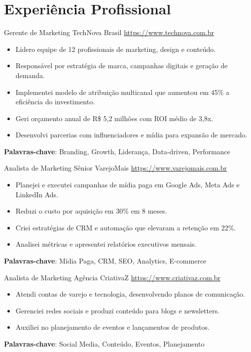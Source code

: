 \documentclass[a4paper, serif, 10pt]{moderncv}
\begin{document}
\section{Experiência Profissional}

        {Gerente de Marketing}
        {TechNova Brasil}
        {\url{https://www.technova.com.br}}
        {}
        {\begin{itemize}
\item Lidero equipe de 12 profissionais de marketing, design e conteúdo.
\item Responsável por estratégia de marca, campanhas digitais e geração de demanda.
\item Implementei modelo de atribuição multicanal que aumentou em 45\% a eficiência do investimento.
\item Geri orçamento anual de R\$ 5,2 milhões com ROI médio de 3,8x.
\item Desenvolvi parcerias com influenciadores e mídia para expansão de mercado.
\end{itemize}
\textbf{Palavras-chave}: Branding, Growth, Liderança, Data-driven, Performance}

        {Analista de Marketing Sênior}
        {VarejoMais}
        {\url{https://www.varejomais.com.br}}
        {}
        {\begin{itemize}
\item Planejei e executei campanhas de mídia paga em Google Ads, Meta Ads e LinkedIn Ads.
\item Reduzi o custo por aquisição em 30\% em 8 meses.
\item Criei estratégias de CRM e automação que elevaram a retenção em 22\%.
\item Analisei métricas e apresentei relatórios executivos mensais.
\end{itemize}
\textbf{Palavras-chave}: Mídia Paga, CRM, SEO, Analytics, E-commerce}

        {Analista de Marketing}
        {Agência CriativaZ}
        {\url{https://www.criativaz.com.br}}
        {}
        {\begin{itemize}
\item Atendi contas de varejo e tecnologia, desenvolvendo planos de comunicação.
\item Gerenciei redes sociais e produzi conteúdo para blogs e newsletters.
\item Auxiliei no planejamento de eventos e lançamentos de produtos.
\end{itemize}
\textbf{Palavras-chave}: Social Media, Conteúdo, Eventos, Planejamento}
\end{document}
